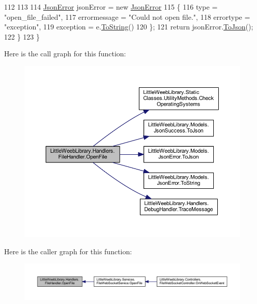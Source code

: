 \begin{DoxyCode}
112 
113 
114                 \mbox{\hyperlink{class_little_weeb_library_1_1_models_1_1_json_error}{JsonError}} jsonError = \textcolor{keyword}{new} \mbox{\hyperlink{class_little_weeb_library_1_1_models_1_1_json_error}{JsonError}}
115                 \{
116                     type = \textcolor{stringliteral}{"open\_file\_failed"},
117                     errormessage = \textcolor{stringliteral}{"Could not open file."},
118                     errortype = \textcolor{stringliteral}{"exception"},
119                     exception = e.\mbox{\hyperlink{class_little_weeb_library_1_1_models_1_1_json_error_ad7d5522c90119111d2e929f39e7f6d3c}{ToString}}()
120                 \};
121                 \textcolor{keywordflow}{return} jsonError.\mbox{\hyperlink{class_little_weeb_library_1_1_models_1_1_json_error_a0e3e7dd2e2990404b7f0461742b23440}{ToJson}}();
122             \}
123         \}
\end{DoxyCode}
Here is the call graph for this function\+:\nopagebreak
\begin{figure}[H]
\begin{center}
\leavevmode
\includegraphics[width=350pt]{class_little_weeb_library_1_1_handlers_1_1_file_handler_a08cbef4974d973035a7ddeedb9f8ff4a_cgraph}
\end{center}
\end{figure}
Here is the caller graph for this function\+:\nopagebreak
\begin{figure}[H]
\begin{center}
\leavevmode
\includegraphics[width=350pt]{class_little_weeb_library_1_1_handlers_1_1_file_handler_a08cbef4974d973035a7ddeedb9f8ff4a_icgraph}
\end{center}
\end{figure}
